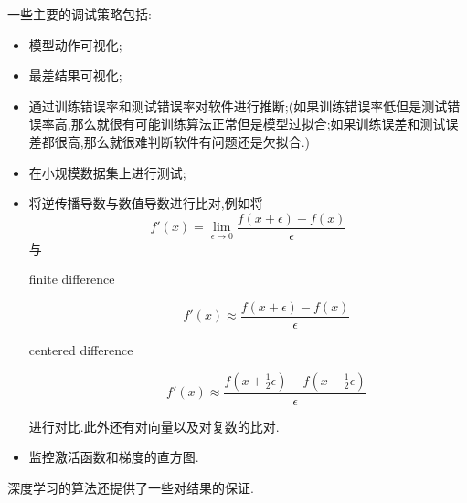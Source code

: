 一些主要的调试策略包括:
\begin{itemize}
    \item 模型动作可视化;
    \item 最差结果可视化;
    \item 通过训练错误率和测试错误率对软件进行推断;(如果训练错误率低但是测试错误率高,那么就很有可能训练算法正常但是模型过拟合;如果训练误差和测试误差都很高,那么就很难判断软件有问题还是欠拟合.)
    \item 在小规模数据集上进行测试;
    \item 将逆传播导数与数值导数进行比对,例如将
    \begin{equation}
    f'(x)=\lim_{\epsilon\to 0}\frac{f(x+\epsilon)-f(x)}{\epsilon}
    \end{equation}
    与
    \begin{description}
        \item [finite difference] \begin{equation}f'(x)\approx\frac{f(x+\epsilon)-f(x)}{\epsilon}\end{equation}
        \item [centered difference] \begin{equation}f'(x)\approx\frac{f(x+\frac{1}{2}\epsilon)-f(x-\frac{1}{2}\epsilon)}{\epsilon}\end{equation}
    \end{description}
    进行对比.此外还有对向量以及对复数的比对.
    \item 监控激活函数和梯度的直方图.
\end{itemize}

深度学习的算法还提供了一些对结果的保证.